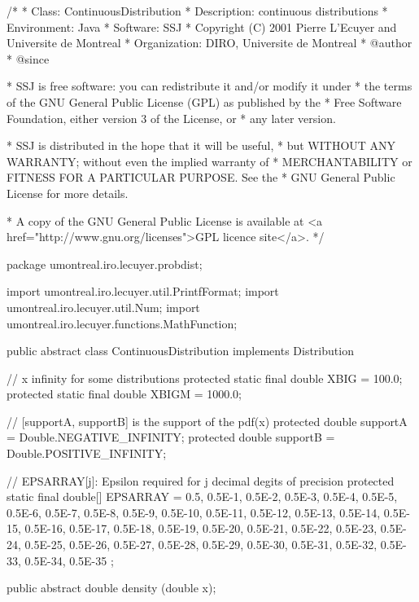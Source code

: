 \begin{code}
\begin{hide}
/*
 * Class:        ContinuousDistribution
 * Description:  continuous distributions
 * Environment:  Java
 * Software:     SSJ
 * Copyright (C) 2001  Pierre L'Ecuyer and Universite de Montreal
 * Organization: DIRO, Universite de Montreal
 * @author
 * @since

 * SSJ is free software: you can redistribute it and/or modify it under
 * the terms of the GNU General Public License (GPL) as published by the
 * Free Software Foundation, either version 3 of the License, or
 * any later version.

 * SSJ is distributed in the hope that it will be useful,
 * but WITHOUT ANY WARRANTY; without even the implied warranty of
 * MERCHANTABILITY or FITNESS FOR A PARTICULAR PURPOSE.  See the
 * GNU General Public License for more details.

 * A copy of the GNU General Public License is available at
   <a href="http://www.gnu.org/licenses">GPL licence site</a>.
 */
\end{hide}
package umontreal.iro.lecuyer.probdist;
\begin{hide}
import umontreal.iro.lecuyer.util.PrintfFormat;
import umontreal.iro.lecuyer.util.Num;
import umontreal.iro.lecuyer.functions.MathFunction;
\end{hide}

public abstract class ContinuousDistribution implements Distribution \begin{hide} {
   @Deprecated
   public int decPrec = 15;

   private int getDecPrec() {
      return decPrec;
   }\end{hide}
\end{code}
\begin{code}\begin{hide}
    // x infinity for some distributions
    protected static final double XBIG = 100.0;
    protected static final double XBIGM = 1000.0;

    // [supportA, supportB] is the support of the pdf(x)
    protected double supportA = Double.NEGATIVE_INFINITY;
    protected double supportB = Double.POSITIVE_INFINITY;

    // EPSARRAY[j]: Epsilon required for j decimal degits of precision
    protected static final double[] EPSARRAY = {
    0.5, 0.5E-1, 0.5E-2, 0.5E-3, 0.5E-4, 0.5E-5, 0.5E-6, 0.5E-7, 0.5E-8,
    0.5E-9, 0.5E-10, 0.5E-11, 0.5E-12, 0.5E-13, 0.5E-14, 0.5E-15, 0.5E-16,
    0.5E-17, 0.5E-18, 0.5E-19, 0.5E-20, 0.5E-21, 0.5E-22, 0.5E-23, 0.5E-24,
    0.5E-25, 0.5E-26, 0.5E-27, 0.5E-28, 0.5E-29, 0.5E-30, 0.5E-31, 0.5E-32,
    0.5E-33, 0.5E-34, 0.5E-35
    };\end{hide}

   public abstract double density (double x);
\end{code}
